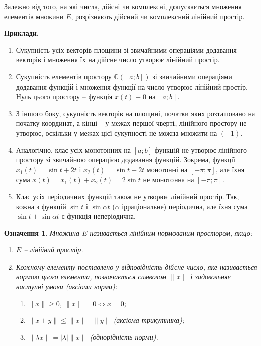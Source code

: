 \documentclass[14pt,twoside]{extreport}
\theoremstyle{mystyle}
\newtheorem{dfn}{Означення}
\numberwithin{equation}{chapter}
\newcommand{\cab}{\mathbb{C}([a; b])}
\begin{document}
Залежно від того, на які числа, дійсні чи комплексні, допускається множення елементів множини $E$, розрізняють дійсний чи комплексний лінійний простір.

\textbf{Приклади.}

\begin{enumerate}
	\item Сукупність усіх векторів площини зі звичайними операціями додавання векторів і множення їх на дійсне число утворює лінійний простір.
	\item Сукупність елементів простору $\cab$ зі звичайними операціями додавання функцій і множення функції на число утворює лінійний простір. Нуль цього простору -- функція $x(t) \equiv 0$ на $[a; b]$.
	\item З іншого боку, сукупність векторів на площині, початки яких розташовано на початку координат, а кінці -- у межах першої чверті, лінійного простору не утворює, оскільки у межах цієї сукупності не можна множити на $(-1)$.
	\item Аналогічно, клас усіх монотонних на $[a; b]$ функцій не утворює лінійного простору зі звичайною операцією додавання функцій. Зокрема, функції $x_1(t) = \sin t + 2t$ і $x_2 (t) = \sin t - 2t$ монотонні на $[-\pi; \pi]$, але їхня сума $x(t) = x_1(t) + x_2(t) = 2 \sin t$ не монотонна на $[-\pi; \pi]$.
	\item Клас усіх періодичних функцій також не утворює лінійний простір. Так, кожна з функцій $\sin t$ і $\sin \alpha t$ ($\alpha$ ірраціональне) періодична, але їхня сума $\sin t + \sin \alpha t$ є функція неперіодична.
\end{enumerate}

\begin{dfn}
Множина $E$ називається лінійним нормованим простором, якщо:

\begin{enumerate}
	\item $E$ -- лінійний простір.
	\item Кожному елементу поставлено у відповідність дійсне число, яке називається нормою цього елемента, позначається символом $\|x\|$ і задовольняє наступні умови (аксіоми норми):
	\begin{enumerate}
		\item $\|x\|\geqslant 0$, $\|x\| = 0 \Leftrightarrow x=0$;
		\item $\|x + y\| \leqslant \|x\| + \|y\|$ (аксіома трикутника);
		\item $\|\lambda x\| = |\lambda| \|x\|$ (однорідність норми).
	\end{enumerate}
\end{enumerate}
\end{dfn}
\end{document}
